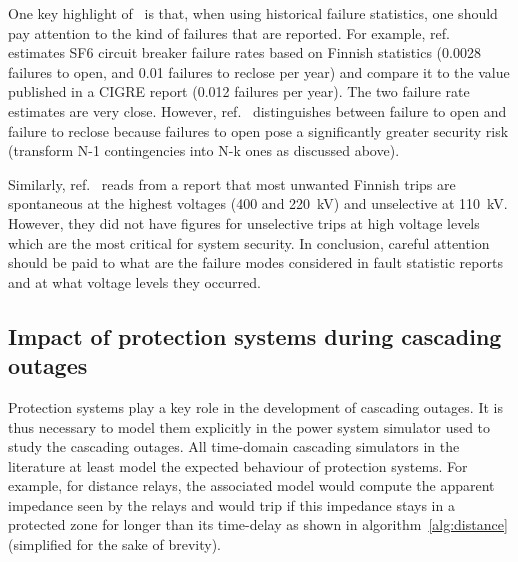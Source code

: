 \begin{tcolorbox}[width=\linewidth, %
    colback=red!5!white,
    colframe=red!75!black,
    breakable,
    title=Note]
One key highlight of~\cite{GridPSA} is that, when using historical failure statistics, one should pay attention to the kind of failures that are reported. For example, ref.~\cite{GridPSA} estimates SF6 circuit breaker failure rates based on Finnish statistics (0.0028 failures to open, and 0.01 failures to reclose per year) and compare it to the value published in a CIGRE report (0.012 failures per year). The two failure rate estimates are very close. However, ref.~\cite{GridPSA} distinguishes between failure to open and failure to reclose because failures to open pose a significantly greater security risk (transform N-1 contingencies into N-k ones as discussed above).

Similarly, ref.~\cite{GridPSA} reads from a report that most unwanted Finnish trips are spontaneous at the highest voltages (400 and 220~kV) and unselective at 110~kV. However, they did not have figures for unselective trips at high voltage levels which are the most critical for system security. In conclusion, careful attention should be paid to what are the failure modes considered in fault statistic reports and at what voltage levels they occurred.
\end{tcolorbox}



\subsection{Impact of protection systems during cascading outages}
\label{sec:protection_cascade}

Protection systems play a key role in the development of cascading outages. It is thus necessary to model them explicitly in the power system simulator used to study the cascading outages. All time-domain cascading simulators in the literature at least model the expected behaviour of protection systems. For example, for distance relays, the associated model would compute the apparent impedance seen by the relays and would trip if this impedance stays in a protected zone for longer than its time-delay as shown in algorithm~\ref{alg:distance} (simplified for the sake of brevity). %

